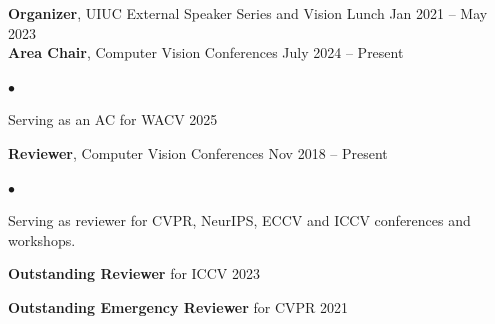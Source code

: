 \documentclass[margin,line]{res}
\newenvironment{list2}{
  \begin{list}{$\bullet$}{%
      \setlength{\itemsep}{0in}
      \setlength{\parsep}{0in} \setlength{\parskip}{0in}
      \setlength{\topsep}{0in} \setlength{\partopsep}{0in} 
      \setlength{\leftmargin}{0.2in}}}{\end{list}}
\begin{document}
\begin{resume}
{\bf Organizer}, UIUC External Speaker Series and Vision Lunch {\hfill Jan 2021 -- May 2023}\\
{\bf Area Chair}, Computer Vision Conferences {\hfill July  2024 -- Present}\vspace*{-0.15in}\\
\begin{list2}
\item  Serving as an AC for WACV 2025
\end{list2}\vspace*{-0.05in} 
{\bf Reviewer}, Computer Vision Conferences {\hfill Nov  2018 -- Present}\vspace*{-0.15in}\\
\begin{list2}
\item  Serving as reviewer for CVPR, NeurIPS, ECCV and ICCV conferences and workshops.
\item {\bf Outstanding Reviewer} for ICCV 2023
\item {\bf Outstanding Emergency Reviewer} for CVPR 2021
\end{list2}\vspace*{-0.05in} 



\end{resume}
\end{document}
